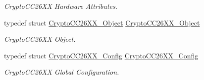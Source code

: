 \begin{DoxyCompactItemize}
\begin{DoxyCompactList}\small\item\em Crypto\+C\+C26\+X\+X Hardware Attributes. \end{DoxyCompactList}\item 
typedef struct \hyperlink{struct_crypto_c_c26_x_x___object}{Crypto\+C\+C26\+X\+X\+\_\+\+Object} \hyperlink{_crypto_c_c26_x_x_8h_a1d3ce506f41ca09dbb4fc02615c54d4e}{Crypto\+C\+C26\+X\+X\+\_\+\+Object}
\begin{DoxyCompactList}\small\item\em Crypto\+C\+C26\+X\+X Object. \end{DoxyCompactList}\item 
typedef struct \hyperlink{struct_crypto_c_c26_x_x___config}{Crypto\+C\+C26\+X\+X\+\_\+\+Config} \hyperlink{_crypto_c_c26_x_x_8h_a7ff3fbcb90bc60cea7c5a281d5c7add2}{Crypto\+C\+C26\+X\+X\+\_\+\+Config}
\begin{DoxyCompactList}\small\item\em Crypto\+C\+C26\+X\+X Global Configuration. \end{DoxyCompactList}\end{DoxyCompactItemize}
